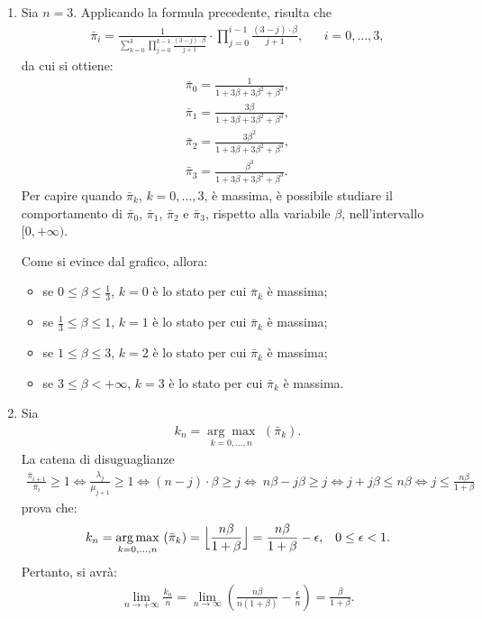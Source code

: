\documentclass[11pt,largemargins]{homework}
\begin{document}
\begin{enumerate}
\item
Sia $n=3$. Applicando la formula precedente, risulta che
\begin{align*}
\bar{\pi}_{i}=\frac{1}{\sum_{k=0}^{3}\prod_{j=0}^{k-1}\frac{\left(3-j\right)\cdot\beta}{j+1}}\cdot\prod_{j=0}^{i-1}\frac{\left(3-j\right)\cdot\beta}{j+1},&&i=0,...,3,
\end{align*}
da cui si ottiene:
\begin{align*}
\bar{\pi}_{0}=\frac{1}{1+3\beta+3\beta^{2}+\beta^{3}},\\
\bar{\pi}_{1}=\frac{3\beta}{1+3\beta+3\beta^{2}+\beta^{3}},\\
\bar{\pi}_{2}=\frac{3\beta^{2}}{1+3\beta+3\beta^{2}+\beta^{3}},\\
\bar{\pi}_{3}=\frac{\beta^{3}}{1+3\beta+3\beta^{2}+\beta^{3}}.
  \end{align*}
  Per capire quando $\bar{\pi}_{k}$, $k=0,...,3$, è massima, è possibile studiare il comportamento di $\bar{\pi}_{0}$, $\bar{\pi}_{1}$, $\bar{\pi}_{2}$ e $\bar{\pi}_{3}$, rispetto alla variabile $\beta$, nell'intervallo $[0,+\infty)$.
  
  \newpage
  Come si evince dal grafico, allora:
  \begin{itemize}
  \item
  se  $0\leq\beta\leq\frac{1}{3}$,  $k=0$ è lo stato per cui $\bar{\pi}_{k}$ è massima;
  \item
  se  $\frac{1}{3}\leq\beta\leq 1$,  $k=1$ è lo stato per cui $\bar{\pi}_{k}$ è massima;
  \item
  se  $1\leq\beta\leq 3$,  $k=2$ è lo stato per cui $\bar{\pi}_{k}$ è massima;
  \item
  se  $3\leq\beta< +\infty$,  $k=3$ è lo stato per cui $\bar{\pi}_{k}$ è massima.
  \end{itemize}
 
  \item
  Sia 
  \begin{align*}  
  k_{n}= \underset{k=0,...,n}{\arg\max} \, \, (\bar{\pi}_{k}).
  \end{align*}
  La catena di disuguaglianze
  \begin{align*}
  \frac{\bar{\pi}_{i+1}}{\bar{\pi}_{i}} \geq 1\Leftrightarrow\frac{\lambda_{j}}{\mu_{j+1}}\geq 1\Leftrightarrow(n-j)\cdot\beta\geq j\Leftrightarrow\ n\beta-j\beta \geq j 
  \Leftrightarrow 
  j+j\beta \leq n\beta
 \Leftrightarrow j \leq \frac{n\beta}{1+\beta}
 \end{align*}
 prova che:
 \begin{align*}
k_{n}= \underset{k=0,...,n}{\arg\max} \, \, (\bar{\pi}_{k}) =\Bigl\lfloor\frac{n\beta}{1+\beta}\Bigr\rfloor=\frac{n\beta}{1+\beta}-\epsilon,&& 0\leq \epsilon<1.
 \end{align*} 
 Pertanto, si avrà:
  \begin{align*}
  \lim\limits_{n \rightarrow +\infty}\frac{k_{n}}{n}=\lim\limits_{n \rightarrow \infty}\left(\frac{n\beta}{n\left(1+\beta\right)}-\frac{\epsilon}{n}\right)=\frac{\beta}{1+\beta}.
  \end{align*}
  

\end{enumerate}
\end{document}
